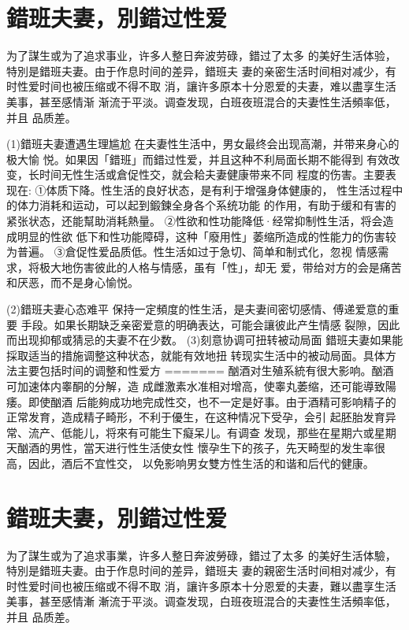 \documentclass[12pt,UTF8]{ctexbook}
\begin{document}
\section{錯班夫妻，別錯过性爱}

为了謀生或为了追求事业，许多人整日奔波劳碌，錯过了太多
的美好生活体验，特別是錯班夫妻。由于作息时间的差异，錯班夫
妻的亲密生活时间相对减少，有时性爱时间也被压缩或不得不取
消，讓许多原本十分恩爱的夫妻，难以盡享生活美事，甚至感情渐
渐流于平淡。调查发现，白班夜班混合的夫妻性生活頻率低，并且
品质差。

(1)錯班夫妻遭遇生理尴尬
在夫妻性生活中，男女最终会出现高潮，并带来身心的极大愉
悦。如果因「錯班」而錯过性爱，并且这种不利局面长期不能得到
有效改变，长时间无性生活或倉促性交，就会耠夫妻健康带来不同
程度的伤害。主要表现在:
①体质下降。性生活的良好状态，是有利于增强身体健康的，
性生活过程中的体力消耗和运动，可以起到鍛鍊全身各个系统功能
的作用，有助于缓和有害的紧张状态，还能幫助消耗熱量。
②性欲和性功能降低·经常抑制性生活，将会造成明显的性欲
低下和性功能障碍，这种「廢用性」萎缩所造成的性能力的伤害较
为普遍。
③倉促性爱品质低。性生活如过于急切、简单和制式化，忽视
情感需求，将极大地伤害彼此的人格与情感，虽有「性」，却无
爱，带给对方的会是痛苦和厌恶，而不是身心愉悦。

(2)錯班夫妻心态难平
保持一定頻度的性生活，是夫妻间密切感情、傅递爱意的重要
手段。如果长期缺乏亲密爱意的明确表达，可能会讓彼此产生情感
裂隙，因此而出现抑郁或猜忌的夫妻不在少数。
(3)刻意协调可扭转被动局面
錯班夫妻如果能採取适当的措施调整这种状态，就能有效地扭
转现实生活中的被动局面。具体方法主要包括时间的调整和性爱方
=======
酗酒对生殖系統有很大影响。酗酒可加速体内睾酮的分解，造
成雌激素水准相对增高，使睾丸萎缩，还可能導致陽痿。即使酗酒
后能夠成功地完成性交，也不一定是好事。由于酒精可影响精子的
正常发育，造成精子畸形，不利于優生，在这种情况下受孕，会引
起胚胎发育异常、流产、低能儿，将來有可能生下癡呆儿。有调查
发现，那些在星期六或星期天酗酒的男性，當天进行性生活使女性
懷孕生下的孩子，先天畸型的发生率很高，因此，酒后不宜性交，
以免影响男女雙方性生活的和谐和后代的健康。

\section{錯班夫妻，別錯过性爱}

为了謀生或为了追求事業，许多人整日奔波勞碌，錯过了太多
的美好生活体驗，特別是錯班夫妻。由于作息时间的差异，錯班夫
妻的親密生活时间相对减少，有时性爱时间也被压缩或不得不取
消，讓许多原本十分恩爱的夫妻，難以盡享生活美事，甚至感情漸
漸流于平淡。调查发现，白班夜班混合的夫妻性生活頻率低，并且
品质差。
\end{document}
